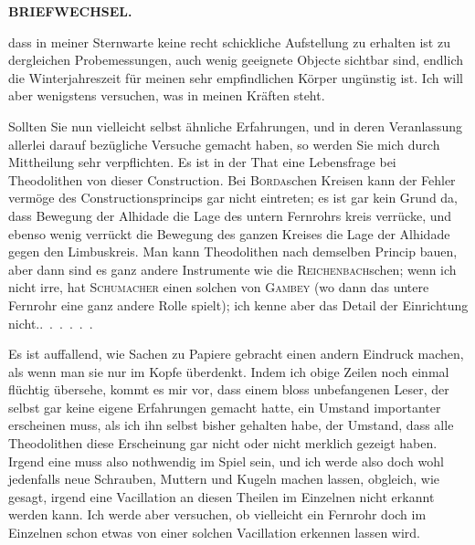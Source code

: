 \par\clearpage
\noindent{}\hfill{\small\textbf{BRIEFWECHSEL.}}\hfill\null\par\medskip
\noindent dass in meiner Sternwarte keine recht schickliche Aufstellung zu erhalten ist zu dergleichen Probemessungen, auch wenig geeignete Objecte sichtbar sind, endlich die Winterjahreszeit für meinen sehr empfindlichen Körper ungünstig ist. Ich will aber wenigstens versuchen, was in meinen Kräften steht.

\par\noindent\hspace*{\parindent}Sollten Sie nun vielleicht selbst ähnliche Erfahrungen, und in deren Veranlassung allerlei darauf bezügliche Versuche gemacht haben, so werden Sie mich durch Mittheilung sehr verpflichten. Es ist in der That eine Lebensfrage bei Theodolithen von dieser Construction. Bei \textsc{Borda}schen Kreisen kann der Fehler vermöge des Constructionsprincips gar nicht eintreten; es ist gar kein Grund da, dass Bewegung der Alhidade die Lage des untern Fernrohrs kreis verrücke, und ebenso wenig verrückt die Bewegung des ganzen Kreises die Lage der Alhidade gegen den Limbuskreis. Man kann Theodolithen nach demselben Princip bauen, aber dann sind es ganz andere Instrumente wie die \textsc{Reichenbach}schen; wenn ich nicht irre, hat \textsc{Schumacher} einen solchen von \textsc{Gambey} (wo dann das untere Fernrohr eine ganz andere Rolle spielt); ich kenne aber das Detail der Einrichtung nicht.\enspace .\ .\ .\ .\ .\ .

\par\noindent\hspace*{\parindent}Es ist auffallend, wie Sachen zu Papiere gebracht einen andern Eindruck machen, als wenn man sie nur im Kopfe überdenkt. Indem ich obige Zeilen noch einmal flüchtig übersehe, kommt es mir vor, dass einem bloss unbefangenen Leser, der selbst gar keine eigene Erfahrungen gemacht hatte, ein Umstand importanter erscheinen muss, als ich ihn selbst bisher gehalten habe, der Umstand, dass alle Theodolithen  diese Erscheinung gar nicht oder nicht merklich gezeigt haben. Irgend eine  muss also nothwendig im Spiel sein, und ich werde also doch wohl jedenfalls neue Schrauben, Muttern und Kugeln machen lassen, obgleich, wie gesagt, irgend eine Vacillation an diesen Theilen im Einzelnen nicht erkannt werden kann. Ich werde aber versuchen, ob vielleicht ein  Fernrohr doch im Einzelnen schon etwas von einer solchen Vacillation erkennen lassen wird.

